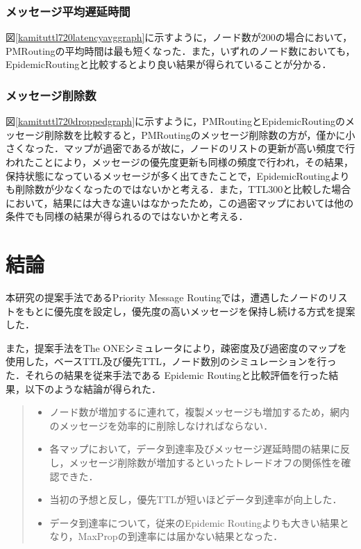 \documentclass[11pt]{icsthesis}
\begin{document}
\subsection{メッセージ平均遅延時間}
図\ref{kamituttl720latencyavggraph}に示すように，ノード数が200の場合において，PMRoutingの平均時間は最も短くなった．また，いずれのノード数においても，EpidemicRoutingと比較するとより良い結果が得られていることが分かる．

\subsection{メッセージ削除数}
図\ref{kamituttl720droppedgraph}に示すように，PMRoutingとEpidemicRoutingのメッセージ削除数を比較すると，PMRoutingのメッセージ削除数の方が，僅かに小さくなった．マップが過密であるが故に，ノードのリストの更新が高い頻度で行われたことにより，メッセージの優先度更新も同様の頻度で行われ，その結果，保持状態になっているメッセージが多く出てきたことで，EpidemicRoutingよりも削除数が少なくなったのではないかと考える．また，TTL300と比較した場合において，結果には大きな違いはなかったため，この過密マップにおいては他の条件でも同様の結果が得られるのではないかと考える．


\chapter{結論}
本研究の提案手法であるPriority Message Routingでは，遭遇したノードのリストをもとに優先度を設定し，優先度の高いメッセージを保持し続ける方式を提案した．

また，提案手法をThe ONEシミュレータにより，疎密度及び過密度のマップを使用した，ベースTTL及び優先TTL，ノード数別のシミュレーションを行った．それらの結果を従来手法である
Epidemic Routingと比較評価を行った結果，以下のような結論が得られた．

\begin{quote}
 \begin{itemize}
  \item ノード数が増加するに連れて，複製メッセージも増加するため，網内のメッセージを効率的に削除しなければならない．
  \item 各マップにおいて，データ到達率及びメッセージ遅延時間の結果に反し，メッセージ削除数が増加するといったトレードオフの関係性を確認できた．
  \item 当初の予想と反し，優先TTLが短いほどデータ到達率が向上した．
  \item データ到達率について，従来のEpidemic Routingよりも大きい結果となり，MaxPropの到達率には届かない結果となった．
 \end{itemize}
\end{quote}
\end{document}
